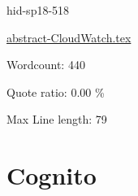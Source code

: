 






\begin{IU}

hid-sp18-518

\href{https://github.com/cloudmesh-community/hid-sp18-518/blob/master//technology/abstract-CloudWatch.tex}{abstract-CloudWatch.tex}

 

Wordcount: 440


Quote ratio: 0.00 \%
 
Max Line length: 79
\end{IU}

\section{Cognito}

